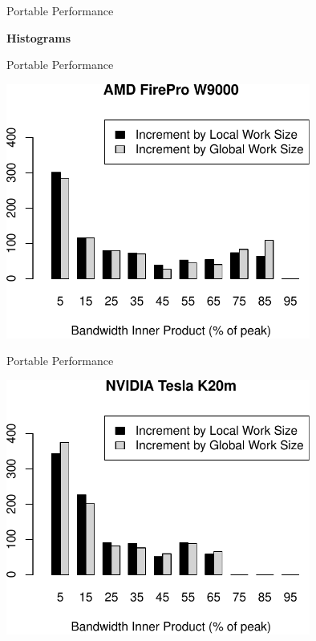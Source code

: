 

\begin{frame}{Portable Performance}
  \begin{center} \Large \textbf{Histograms} \end{center}
\end{frame}

\begin{frame}{Portable Performance}
  \begin{center} \includegraphics[width=0.75\textwidth]{figures/firepro_w9000_double_hist_itertype_dot} \end{center}
\end{frame}

\begin{frame}{Portable Performance}
  \begin{center} \includegraphics[width=0.75\textwidth]{figures/k20m_double_hist_itertype_dot} \end{center}
\end{frame}

